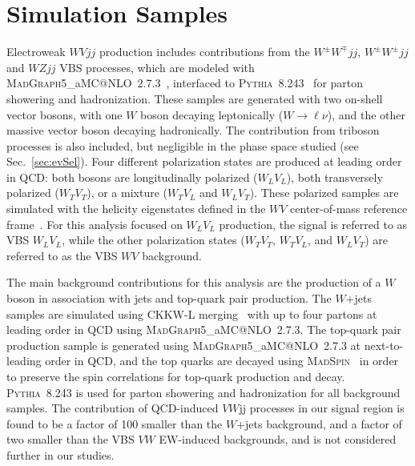\documentclass[amsmath,amssymb,aps,prd,preprint,groupedaddress]{revtex4-2}
\makeatletter
\newcommand*{\MGMCatNLO}{\textsc{MadGraph5}\_aMC@NLO\xspace}
\newcommand*{\MadGraph}{\MGMCatNLO}
\newcommand*{\MADSPIN}{\textsc{MadSpin}\xspace}
\newcommand*{\MadSpin}{\MADSPIN}
\newcommand*{\PYTHIA}{\textsc{Pythia}\xspace}
\newcommand*{\Pythia}{\PYTHIA}
\makeatother
\begin{document}
 
\section{Simulation Samples}
\label{sec:samples}
Electroweak $WVjj$ production includes contributions from the $W^\pm W^\mp jj$, 
$W^\pm W^\pm jj$ and $W Z jj$ VBS processes, which are modeled with 
\MGMCatNLO~2.7.3~\cite{Alwall:2014hca},
interfaced to \PYTHIA~8.243~\cite{Sjostrand:2007gs} for parton showering and hadronization. 
These samples are generated with two on-shell vector bosons, with one $W$ boson decaying leptonically ($W \rightarrow \ell\nu$), and the other massive vector boson decaying hadronically.
The contribution from triboson processes is also included,
but negligible in the phase space studied (see Sec.~\ref{sec:evSel}).
Four different polarization states are produced at leading order in QCD: both bosons are longitudinally polarized ($W_{L}V_{L}$), both transversely polarized ($W_{T}V_{T}$),
or a mixture ($W_{T}V_{L}$ and $W_{L}V_{T}$). 
These polarized samples are simulated with the helicity eigenstates defined in the $WV$ center-of-mass reference frame~\cite{BuarqueFranzosi:2019boy}.
For this analysis focused on $W_{L}V_{L}$ production, the signal is referred to as VBS $W_{L}V_{L}$, while the other polarization states ($W_{T}V_{T}$, $W_{T}V_{L}$, 
and $W_{L}V_{T}$) are referred to as the VBS $WV$ background.

The main background contributions for this analysis are the production of a $W$ boson in association with jets and top-quark pair production. 
The $W$+jets samples are simulated using CKKW-L merging~\cite{Catani:2001cc,Lonnblad:2001iq} with up to four partons at leading order in QCD using \MadGraph~2.7.3.
The top-quark pair production sample is generated using \MadGraph~2.7.3 at next-to-leading order in QCD, and the top quarks are decayed using \MadSpin~\cite{Artoisenet:2012st} in order to preserve the spin correlations for top-quark production and decay.
\Pythia~8.243 is used for parton showering and hadronization for all background samples.
The contribution of QCD-induced $VW$jj processes in our signal region is found to be a factor of 100 smaller than the $W$+jets background, and a factor of two smaller than the VBS $VW$ EW-induced backgrounds, and is not considered further in our studies.
\end{document}
